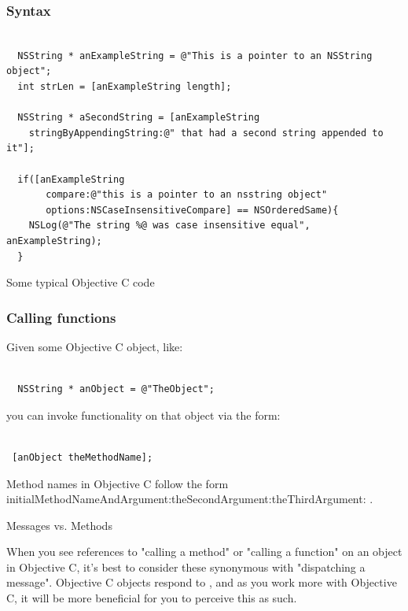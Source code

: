 \documentclass[10pt]{beamer}
\begin{document}
    
\begin{frame}[fragile]
  \frametitle{Syntax}
  \begin{listing}[H]
    \begin{verbatim}

  NSString * anExampleString = @"This is a pointer to an NSString object";
  int strLen = [anExampleString length];

  NSString * aSecondString = [anExampleString
    stringByAppendingString:@" that had a second string appended to it"];

  if([anExampleString
       compare:@"this is a pointer to an nsstring object"
       options:NSCaseInsensitiveCompare] == NSOrderedSame){
    NSLog(@"The string %@ was case insensitive equal", anExampleString);
  }

  \end{verbatim}
    \caption{Some typical Objective C code}
    \label{listing:4}
  \end{listing}

\end{frame}

    
\begin{frame}[fragile]
  \frametitle{Calling functions}
  Given some Objective C object, like:
\begin{verbatim}

  NSString * anObject = @"TheObject";

  \end{verbatim}

you can invoke functionality on that object via the form:
\begin{verbatim}

 [anObject theMethodName];

 \end{verbatim}

Method names in Objective C follow the form initialMethodNameAndArgument:theSecondArgument:theThirdArgument: . 
\begin{block}{Messages vs. Methods}

  When you see references to "calling a method" or "calling a function" on an object in Objective C, it's best to
  consider these synonymous with "dispatching a message".  Objective C objects respond to
  , and as you work more with Objective C, it will be more beneficial for
  you to perceive this as such.  

  \end{block}

\end{frame}
\end{document}
